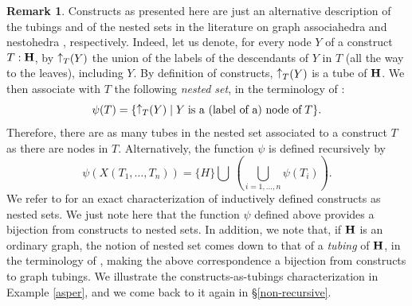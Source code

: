 \documentclass[11pt]{article}
\theoremstyle{definition}
\newtheorem{remark}[theo]{Remark}
\numberwithin{equation}{section}
\numberwithin{equation}{section}
\newcommand{\set}[1]{\{#1\}}
\newcommand{\setc}[2]{\set{#1 \mid #2}}
\newcommand{\Union}{\bigcup}		%
\newcommand{\hyper}[1]{{\bf #1}}
\newcommand{\mathraise}[4]{
\mathchoice
{\raisebox{#2}{$\displaystyle{#1}$}}
{\raisebox{#2}{$#1$}}
{\raisebox{#3}{$\scriptstyle{#1}$}}
{\raisebox{#4}{$\scriptscriptstyle{#1}$}}
}
\newcommand{\mathraiseord}[4]{\mathord{\mathraise#1{#2}{#3}{#4}}}
\newcommand{\valup}{\mathraiseord{\uparrow}{0.29ex}{0.21ex}{0.16ex}}
\begin{document}
\begin{remark}\label{tub}
Constructs as presented here are  just an alternative description of the tubings and of the nested sets  in the literature on graph associahedra \cite{CD-CCGA} and nestohedra \cite{P09}, respectively. Indeed, let us denote, for every node $Y$ of a construct  $T:{\bf H}$, by $\valup_T(Y)$   the union of the  labels of the descendants of $Y$ in $T$ (all the way to the leaves), including $Y$. 
  By definition of constructs, $\valup_T(Y)$ is a tube of $\hyper{H}$.  We then associate with $T$ the following  {\em nested set}, in the terminology of \cite{P09}:
$$\psi(T)= \setc{\valup_T(Y)}{Y\;\mbox{is a (label of a) node of}\;T}.$$ Therefore, there are  as many tubes in the nested set associated to a construct $T$ as there are nodes in $T$. 
Alternatively, the function $\psi$ is defined recursively by
$$\psi(X(T_1,\ldots,T_n))= \set{H}\Union\: (\Union_{i=1,\ldots,n} \psi(T_i)).$$
We refer to \cite[Proposition 2]{COI} for an exact characterization of inductively defined constructs as nested sets. We just note here that the function $\psi$ defined above provides a bijection from constructs to nested sets. In addition, we note that, if ${\bf H}$ is an ordinary graph, the notion of nested set comes down to that of a {\em tubing} of ${\bf H}$, in the terminology of \cite{CD-CCGA}, making the above   correspondence   a bijection from constructs to graph tubings.
  We illustrate the constructs-as-tubings characterization in Example \ref{asper}, and we come back to it again in   \S\ref{non-recursive}.
\end{remark}
\end{document}
